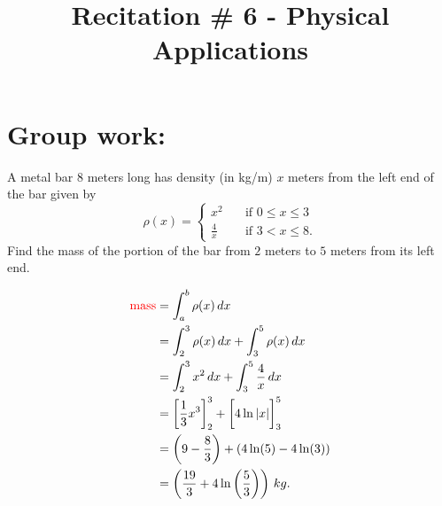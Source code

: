 \documentclass[noinstructornotes]{ximera}
\title{Recitation \# 6 - Physical Applications}
\begin{document}
\begin{abstract}		\end{abstract}
\maketitle

\section{Group work:}



\begin{problem}
A metal bar $8$ meters long has density (in kg/m) $x$ meters from the left end of the bar given by
	\begin{equation*}
	\rho(x) = \left\{ \begin{array}{rl} x^2 & \quad \text{if } 0 \leq x \leq 3 \\ \frac{4}{x} & \quad \text{if } 3 < x \leq 8. \end{array} \right.  
	\end{equation*}
Find the mass of the portion of the bar from $2$ meters to $5$ meters from its left end.
	
	\begin{freeResponse}
		\begin{align*}
		\text{{\color{red} mass}} &= \int_a^b \rho(x) \,d x  \\
		&= \int_2^3 \rho(x) \,d x + \int_3^5 \rho(x) \,d x  \\
		&= \int_2^3 x^2 \,d x + \int_3^5 \frac{4}{x} \,d x  \\
		&= \bigg[ \frac{1}{3} x^3 \bigg]_2^3 + \bigg[ 4 \ln|x| \bigg]_3^5  \\
		&= \left( 9 - \frac{8}{3} \right) + \left(4 \ln (5) - 4 \ln (3) \right)  \\
		&= \left( \frac{19}{3} + 4 \ln \left( \frac{5}{3} \right) \right) \, kg.
		\end{align*}
	\end{freeResponse}
	
\end{problem}
\end{document}
